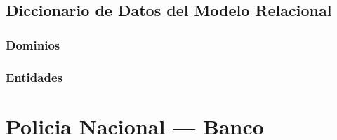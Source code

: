 \documentclass[12pt]{article}
\begin{document}
{\begin{landscape}
    \subsection{Diccionario de Datos del Modelo Relacional}
    
    \subsubsection{Dominios}
    \begin{center}
        
    \end{center}
    
    \subsubsection{Entidades}
    \begin{center}
        
    \end{center}
    
    \end{landscape}
}

\newpage
\section{Policia Nacional --- Banco}


\end{document}
